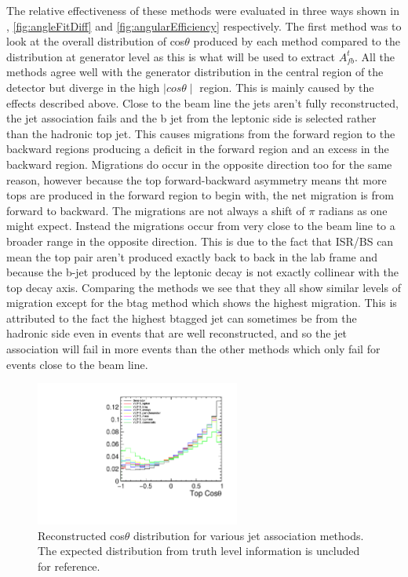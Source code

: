 The relative effectiveness of these methods were evaluated in three ways shown in , \ref{fig:angleFitDiff} and \ref{fig:angularEfficiency} respectively. The first method was to look at the overall distribution of cos$\theta$ produced by each method compared to the distribution at generator level as this is what will be used to extract $A_{fb}^{t}$. All the methods agree well with the generator distribution in the central region of the detector but diverge in the high $\mid cos\theta\mid$ region. This is mainly caused by the effects described above. Close to the beam line the jets aren't fully reconstructed, the jet association fails and the b jet from the leptonic side is selected rather than the hadronic top jet. This causes migrations from the forward region to the backward regions producing a deficit in the forward region and an excess in the backward region. Migrations do occur in the opposite direction too for the same reason, however because the top forward-backward asymmetry means tht more tops are produced in the forward region to begin with, the net migration is from forward to backward. The migrations are not always a shift of $\pi$ radians as one might expect. Instead the migrations occur from very close to the beam line to a broader range in the opposite direction. This is due to the fact that \ac{ISR}/\ac{BS} can mean the top pair aren't produced exactly back to back in the lab frame and because the b-jet produced by the leptonic decay is not exactly collinear with the top decay axis. Comparing the methods we see that they all show similar levels of migration except for the btag method which shows the highest migration. This is attributed to the fact the highest btagged jet can sometimes be from the hadronic side even in events that are well reconstructed, and so the jet association will fail in more events than the other methods which only fail for events close to the beam line.

\begin{figure}
  \centering
  \includegraphics[width=0.6\textwidth]{TopAnalysis/figures/comparejetmethods.pdf}
  \caption[Reconstructed cos$\theta$ distribution for various jet association methods]{Reconstructed cos$\theta$ distribution for various jet association methods. The expected distribution from truth level information is uncluded for reference.}
  \label{fig:methodComparison}
\end{figure}

